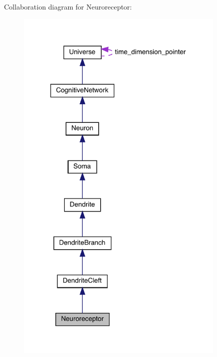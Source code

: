 Collaboration diagram for Neuroreceptor\+:
\nopagebreak
\begin{figure}[H]
\begin{center}
\leavevmode
\includegraphics[width=283pt]{class_neuroreceptor__coll__graph}
\end{center}
\end{figure}
